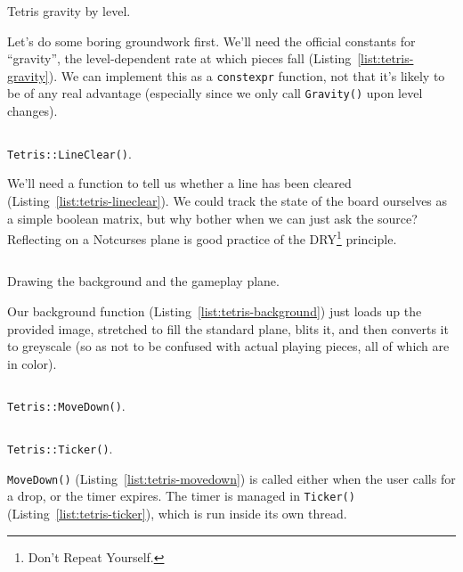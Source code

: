 \pagebreak

\begin{listing}[!htb]
\inputminted[]{C}{code-tetris/gravity.h}
\caption{Tetris gravity by level.}
\label{list:tetris-gravity}
\end{listing}

Let's do some boring groundwork first. We'll need the official constants for
``gravity'', the level-dependent rate at which pieces fall
(Listing~\ref{list:tetris-gravity}). We can implement this as a
\texttt{constexpr} function, not that it's likely to be of any real
advantage (especially since we only call \texttt{Gravity()} upon level changes).

\begin{listing}[!htb]
\inputminted[]{C}{code-tetris/clear.h}
\caption{\texttt{Tetris::LineClear()}.}
\label{list:tetris-lineclear}
\end{listing}

We'll need a function to tell us whether a line has been cleared
(Listing~\ref{list:tetris-lineclear}). We could track the state of the board
ourselves as a simple boolean matrix, but why bother when we can just ask the
source? Reflecting on a Notcurses plane is good practice of the
DRY\footnote{Don't Repeat Yourself.} principle.

\pagebreak

\begin{listing}[!htb]
\inputminted[]{C}{code-tetris/background.h}
\caption{Drawing the background and the gameplay plane.}
\label{list:tetris-background}
\end{listing}

Our background function (Listing~\ref{list:tetris-background}) just loads up
the provided image, stretched to fill the standard plane, blits it, and then
converts it to greyscale (so as not to be confused with actual playing pieces,
all of which are in color).

\begin{listing}[!htb]
\inputminted[]{C}{code-tetris/movedown.h}
\caption{\texttt{Tetris::MoveDown()}.}
\label{list:tetris-movedown}
\end{listing}

\begin{listing}[!htb]
\inputminted[]{C}{code-tetris/ticker.h}
\caption{\texttt{Tetris::Ticker()}.}
\label{list:tetris-ticker}
\end{listing}

\texttt{MoveDown()} (Listing~\ref{list:tetris-movedown}) is called either when
the user calls for a drop, or the timer expires. The timer is managed in
\texttt{Ticker()} (Listing~\ref{list:tetris-ticker}), which is run inside its
own thread.

